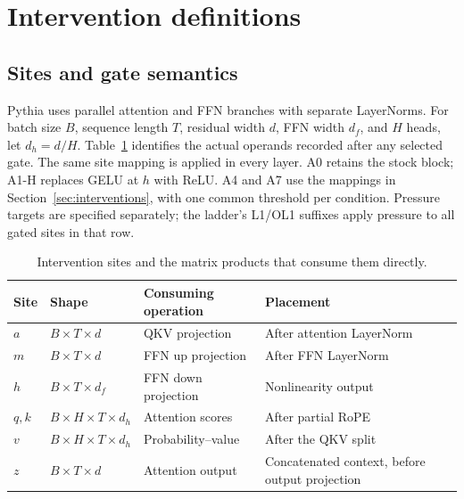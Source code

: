 \section{Intervention definitions}
\label{app:interventions}

\subsection{Sites and gate semantics}

Pythia uses parallel attention and FFN branches with separate LayerNorms.
For batch size $B$, sequence length $T$, residual width $d$, FFN width $d_f$,
and $H$ heads, let $d_h=d/H$. Table~\ref{tab:sites} identifies the actual
operands recorded after any selected gate. The same site mapping is applied
in every layer. A0 retains the stock block; A1-H replaces GELU at $h$ with
ReLU. A4 and A7 use the mappings in Section~\ref{sec:interventions}, with one
common threshold per condition. Pressure targets are specified separately;
the ladder's L1/OL1 suffixes apply pressure to all gated sites in that row.

\begin{table}[ht]
\centering\small
\caption{Intervention sites and the matrix products that consume them directly.}
\label{tab:sites}
\vspace{4pt}
\begin{tabularx}{\linewidth}{@{}lllX@{}}
\toprule
Site & Shape & Consuming operation & Placement \\
\midrule
$a$ & $B\!\times\!T\!\times\!d$ & QKV projection & After attention LayerNorm \\
$m$ & $B\!\times\!T\!\times\!d$ & FFN up projection & After FFN LayerNorm \\
$h$ & $B\!\times\!T\!\times\!d_f$ & FFN down projection & Nonlinearity output \\
$q,k$ & $B\!\times\!H\!\times\!T\!\times\!d_h$ & Attention scores & After partial RoPE \\
$v$ & $B\!\times\!H\!\times\!T\!\times\!d_h$ & Probability--value & After the QKV split \\
$z$ & $B\!\times\!T\!\times\!d$ & Attention output & Concatenated context, before output projection \\
\bottomrule
\end{tabularx}
\end{table}

